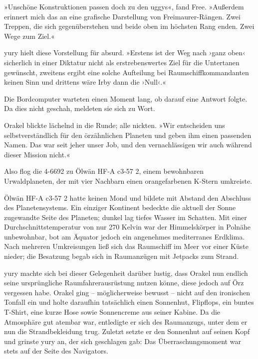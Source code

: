 »Unschöne Konstruktionen passen doch zu den uggys«, fand Free. »Außerdem erinnert mich das an eine grafische Darstellung von Freimaurer-Rängen. Zwei Treppen, die sich gegenüberstehen und beide oben im höchsten Rang enden. Zwei Wege zum Ziel.«

yury hielt diese Vorstellung für absurd. »Erstens ist der Weg nach ›ganz oben‹ sicherlich in einer Diktatur nicht als erstrebenswertes Ziel für die Untertanen gewünscht, zweitens ergibt eine solche Aufteilung bei Raumschiffkommandanten keinen Sinn und drittens wäre Irby dann die ›Null‹.«

Die Bordcomputer warteten einen Moment lang, ob darauf eine Antwort folgte. Da dies nicht geschah, meldeten sie sich zu Wort. 

Orakel blickte lächelnd in die Runde; alle nickten. »Wir entscheiden uns selbstverständlich für den örzähnlichen Planeten und geben ihm einen passenden Namen. Das war seit jeher unser Job, und den vernachlässigen wir auch während dieser Mission nicht.«

Also flog die 4-6692 zu Ölwän HF-A c3-57 2, einem bewohnbaren Urwaldplaneten, der mit vier Nachbarn einen orangefarbenen K-Stern umkreiste.

Ölwän HF-A c3-57 2 hatte keinen Mond und bildete mit Abstand den Abschluss des Planetensystems. Ein einziger Kontinent bedeckte die aktuell der Sonne zugewandte Seite des Planeten; dunkel lag tiefes Wasser im Schatten. Mit einer Durchschnittstemperatur von nur 270 Kelvin war der Himmelskörper in Polnähe unbewohnbar, bot am Äquator jedoch ein angenehmes mediterranes Erdklima. Nach mehreren Umkreisungen ließ sich das Raumschiff im Meer vor einer Küste nieder; die Besatzung begab sich in Raumanzügen mit Jetpacks zum Strand.

yury machte sich bei dieser Gelegenheit darüber lustig, dass Orakel nun endlich seine ursprüngliche Raumfahrerausrüstung nutzen könne, diese jedoch auf Örz vergessen habe. Orakel ging – möglicherweise bewusst – nicht auf den ironischen Tonfall ein und holte daraufhin tatsächlich einen Sonnenhut, Flipflops, ein buntes T-Shirt, eine kurze Hose sowie Sonnencreme aus seiner Kabine. Da die Atmosphäre gut atembar war, entledigte er sich des Raumanzugs, unter dem er nun die Strandbekleidung trug. Zuletzt setzte er den Sonnenhut auf seinen Kopf und grinste yury an, der sich geschlagen gab: Das Überraschungsmoment war stets auf der Seite des Navigators.

